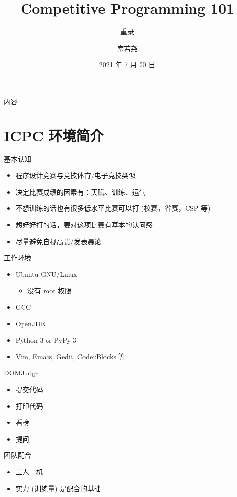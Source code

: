 \documentclass[10pt,mathserif]{beamer}
\title{Competitive Programming 101}
\subtitle{重录}
\institute{西安电子科技大学程序设计竞赛实训基地}
\author{席若尧}
\date{2021 年 7 月 20 日}
\begin{document}
%
{\xdbg {}}

\begin{frame}{内容}
	\tableofcontents[hideallsubsections]
\end{frame}

\section{ICPC 环境简介}
\sectionpage

\begin{frame}{基本认知}
	\begin{itemize}
		\item 程序设计竞赛与竞技体育/电子竞技类似
		\item 决定比赛成绩的因素有：天赋、训练、运气
		\item 不想训练的话也有很多低水平比赛可以打 (校赛，省赛，CSP 等)
		\item 想好好打的话，要对这项比赛有基本的认同感
		\item 尽量避免自视高贵/发表暴论
	\end{itemize}
\end{frame}

\begin{frame}{工作环境}
	\begin{itemize}
		\item Ubuntu GNU/Linux
			\begin{itemize}
				\item 没有 root 权限
			\end{itemize}
		\item GCC
		\item OpenJDK
		\item Python 3 or PyPy 3
		\item Vim, Emacs, Gedit, Code::Blocks 等
	\end{itemize}
\end{frame}

\begin{frame}{DOMJudge}
	\begin{itemize}
		\item 提交代码
		\item 打印代码
		\item 看榜
		\item 提问
	\end{itemize}
\end{frame}

\begin{frame}{团队配合}
	\begin{itemize}
		\item 三人一机
		\item 实力 (训练量) 是配合的基础
	\end{itemize}
\end{frame}
\end{document}

